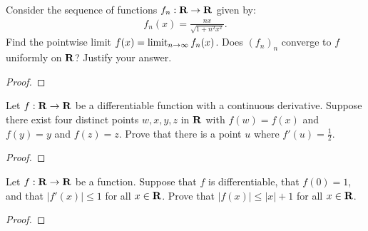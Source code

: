 \documentclass[11pt,twoside,openany]{memoir}
\begin{document}
\newpage
\fancyhead[L]{\scalebox{0.9}{Continuity}}
\fancyhead[R]{\scalebox{0.9}{Appeared on: W22}}
\begin{problem}
    Consider the sequence of functions $f_n:\mathbf{R} \rightarrow \mathbf{R}$ given by:
        \begin{equation*}
        \begin{split}
            f_n(x) = \frac{nx}{\sqrt{1 + n^2 x^2}}.
        \end{split}
        \end{equation*}
    Find the pointwise limit $f(x) = \operatorname*{limit}_{n \rightarrow \infty}f_n(x)$. Does $(f_n)_n$ converge to $f$ uniformly on $\mathbf{R}$? Justify your answer.
\end{problem}
\begin{proof}
\end{proof}

\newpage
\fancyhead[L]{\scalebox{0.9}{Derivatives and the Mean Value Theorem}}
\fancyhead[R]{\scalebox{0.9}{Appeared on: S21}}
\begin{problem}
    Let $f:\mathbf{R} \rightarrow \mathbf{R}$ be a differentiable function with a continuous derivative. Suppose there exist four distinct points $w,x,y,z$ in $\mathbf{R}$ with $f(w) = f(x)$ and $f(y) = y$ and $f(z) = z$. Prove that there is a point $u$ where $f'(u) = \frac{1}{2}$.
\end{problem}
\begin{proof}
\end{proof}

\newpage
\fancyhead[L]{\scalebox{0.9}{Derivatives and the Mean Value Theorem}}
\fancyhead[R]{\scalebox{0.9}{Appeared on: W21}}
\begin{problem}
    Let $f:\mathbf{R} \rightarrow \mathbf{R}$ be a function. Suppose that $f$ is differentiable, that $f(0) = 1$, and that $|f'(x)| \leq 1$ for all $x \in \mathbf{R}$. Prove that $|f(x)| \leq |x| + 1$ for all $x \in \mathbf{R}$.
\end{problem}
\begin{proof}
\end{proof}
\end{document}
